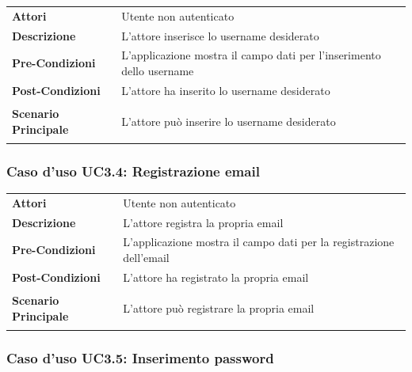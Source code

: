 \begin{longtable}{ l | p{11cm}}
	\hline
	\rowcolor{Gray}
	 \multicolumn{2}{c}{UC3.3: Inserimento username} \\
	 \hline
	\textbf{Attori} & Utente non autenticato \\
	\textbf{Descrizione} & L'attore inserisce lo username desiderato \\
	\textbf{Pre-Condizioni} & L'applicazione mostra il campo dati per l'inserimento dello username \\
	\textbf{Post-Condizioni} & L'attore ha inserito lo username desiderato \\
	\textbf{Scenario Principale} & 
	\begin{enumerate*}[label=(\arabic*.),itemjoin={\newline}]
		\item L'attore può inserire lo username desiderato
	\end{enumerate*}\\
\end{longtable}

\subsubsection{Caso d'uso UC3.4: Registrazione email}
\label{UC3_4}

\begin{longtable}{ l | p{11cm}}
	\hline
	\rowcolor{Gray}
	 \multicolumn{2}{c}{UC3.4 - Registrazione email} \\
	 \hline
	\textbf{Attori} & Utente non autenticato \\
	\textbf{Descrizione} & L'attore registra la propria email \\
	\textbf{Pre-Condizioni} & L'applicazione mostra il campo dati per la registrazione dell'email \\
	\textbf{Post-Condizioni} & L'attore ha registrato la propria email \\
	\textbf{Scenario Principale} & 
	\begin{enumerate*}[label=(\arabic*.),itemjoin={\newline}]
		\item L'attore può registrare la propria email
	\end{enumerate*}
\end{longtable}

\subsubsection{Caso d'uso UC3.5: Inserimento password}
\label{UC3_5}

